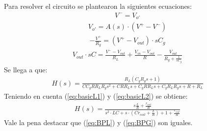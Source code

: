 Para resolver el circuito se plantearon la siguientes ecuaciones:
\begin{align}V^- = V_{o'}\end{align}
\begin{align}V_{o'} = A(s)\cdot (V^+-V^-)\end{align}
\begin{align} -\frac{V^+}{R_g}=(V^+-V_{out})\cdot sC_g \end{align}
\begin{align}  V_{out}\cdot sC= \frac{V^--V_{out}}{R_L}+\frac{V_{in}-V_{out}}{R}-\frac{V_{out}}{R_g+\frac{1}{sC_g}}\end{align}
Se llega a que:
\begin{align}H(s)=\frac{R_{L} \left(C_{g} R_{g} s + 1\right)}{C C_{g} R R_{L} R_{g} s^{2} + C R R_{L} s + C_{g} R R_{L} s + C_{g} R_{L} R_{g} s + R + R_{L}}
\end{align}
Teniendo en cuenta (\ref{eq:basicL1}) y (\ref{eq:basicL2}) se obtiene:
\begin{align}H(s)=\frac{s\frac{L}{R}+\frac{r_{coil}}{R}}{s^2\cdot LC +s \cdot (Cr_{coil}+\frac{L}{R})+1+\frac{r_{coil}}{R}}
\label{eq:BPG}
\end{align}
Vale la pena destacar que (\ref{eq:BPL}) y (\ref{eq:BPG}) son iguales.
